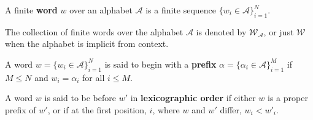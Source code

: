 \begin{definition}
  A finite \textbf{word} $w$ over an alphabet $\mathcal A$ is a finite sequence
  $\{w_i \in \mathcal A\}_{i=1}^N$.

  The collection of finite words over the alphabet $\mathcal A$ is denoted by
  $\mathcal{W}_\mathcal{A}$, or just $\mathcal{W}$ when the alphabet is
  implicit from context.
\end{definition}

\begin{definition}
  A word $w = \{w_i \in \mathcal A\}_{i=1}^N$ is said to begin with a
  \textbf{prefix} $\alpha = \{\alpha_i \in \mathcal A\}_{i=1}^M$ if
  $M \leq N$ and $w_i = \alpha_i$ for all $i \leq M$.
\end{definition}

\begin{definition}
  A word $w$ is said to be before $w'$ in \textbf{lexicographic order}
  if either $w$ is a proper prefix of $w'$, or if at the first position, $i$,
  where $w$ and $w'$ differ, $w_i < w'_i$.
\end{definition}

